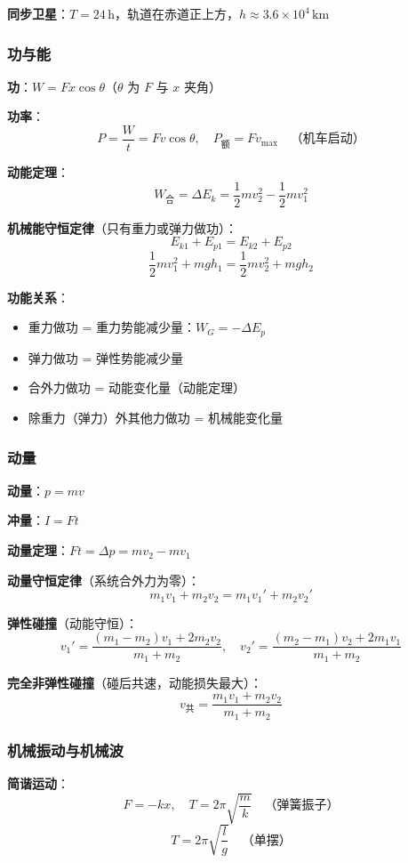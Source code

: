 \textbf{同步卫星}：$T = 24\,\text{h}$，轨道在赤道正上方，$h \approx 3.6\times10^4\,\text{km}$

\subsubsection{功与能}

\textbf{功}：$W = Fx\cos\theta$（$\theta$ 为 $F$ 与 $x$ 夹角）

\textbf{功率}：
\[
P = \frac{W}{t} = Fv\cos\theta,\quad
P_{\text{额}} = Fv_{\text{max}} \quad\text{（机车启动）}
\]

\textbf{动能定理}：
\[
W_{\text{合}} = \Delta E_k = \frac12 mv_2^2 - \frac12 mv_1^2
\]

\textbf{机械能守恒定律}（只有重力或弹力做功）：
\[
E_{k1} + E_{p1} = E_{k2} + E_{p2}
\]
\[
\frac12 mv_1^2 + mgh_1 = \frac12 mv_2^2 + mgh_2
\]

\textbf{功能关系}：
\begin{itemize}
  \item 重力做功 = 重力势能减少量：$W_G = -\Delta E_p$
  \item 弹力做功 = 弹性势能减少量
  \item 合外力做功 = 动能变化量（动能定理）
  \item 除重力（弹力）外其他力做功 = 机械能变化量
\end{itemize}

\subsubsection{动量}

\textbf{动量}：$p = mv$

\textbf{冲量}：$I = Ft$

\textbf{动量定理}：$Ft = \Delta p = mv_2 - mv_1$

\textbf{动量守恒定律}（系统合外力为零）：
\[
m_1v_1 + m_2v_2 = m_1v_1' + m_2v_2'
\]

\textbf{弹性碰撞}（动能守恒）：
\[
v_1' = \frac{(m_1-m_2)v_1 + 2m_2v_2}{m_1+m_2},\quad
v_2' = \frac{(m_2-m_1)v_2 + 2m_1v_1}{m_1+m_2}
\]

\textbf{完全非弹性碰撞}（碰后共速，动能损失最大）：
\[
v_{\text{共}} = \frac{m_1v_1+m_2v_2}{m_1+m_2}
\]

\subsubsection{机械振动与机械波}

\textbf{简谐运动}：
\[
F = -kx,\quad
T = 2\pi\sqrt{\frac{m}{k}}\quad\text{（弹簧振子）}
\]
\[
T = 2\pi\sqrt{\frac{l}{g}}\quad\text{（单摆）}
\]

